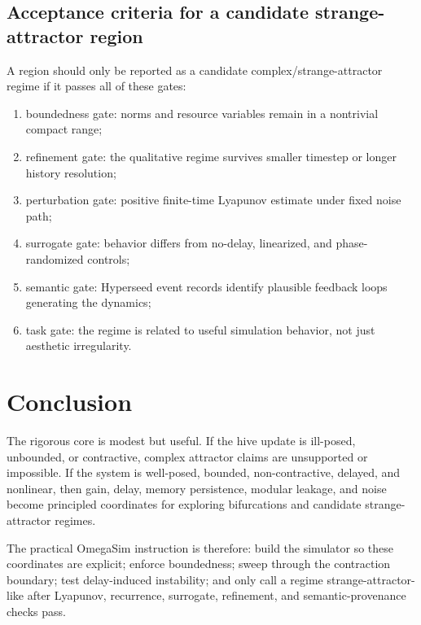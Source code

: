 \documentclass[11pt]{article}
\begin{document}
\subsection{Acceptance criteria for a candidate strange-attractor region}

A region should only be reported as a candidate complex/strange-attractor regime
if it passes all of these gates:
\begin{enumerate}
  \item boundedness gate: norms and resource variables remain in a nontrivial
        compact range;
  \item refinement gate: the qualitative regime survives smaller timestep or
        longer history resolution;
  \item perturbation gate: positive finite-time Lyapunov estimate under fixed
        noise path;
  \item surrogate gate: behavior differs from no-delay, linearized, and
        phase-randomized controls;
  \item semantic gate: Hyperseed event records identify plausible feedback loops
        generating the dynamics;
  \item task gate: the regime is related to useful simulation behavior, not just
        aesthetic irregularity.
\end{enumerate}

\section{Conclusion}

The rigorous core is modest but useful.  If the hive update is ill-posed,
unbounded, or contractive, complex attractor claims are unsupported or impossible.
If the system is well-posed, bounded, non-contractive, delayed, and nonlinear,
then gain, delay, memory persistence, modular leakage, and noise become principled
coordinates for exploring bifurcations and candidate strange-attractor regimes.

The practical OmegaSim instruction is therefore: build the simulator so these
coordinates are explicit; enforce boundedness; sweep through the contraction
boundary; test delay-induced instability; and only call a regime
strange-attractor-like after Lyapunov, recurrence, surrogate, refinement, and
semantic-provenance checks pass.


\end{document}
